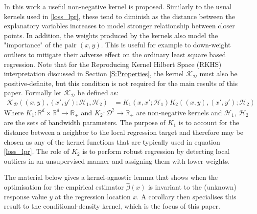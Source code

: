 \documentclass[preprint,1p,times,authoryear]{elsarticle}
\begin{document}
In this work a useful non-negative kernel is proposed. Similarly to the usual kernels used in \eqref{loss_lpr}, these tend to diminish as the distance between the explanatory variables increases to model stronger relationship between closer points. In addition, the weights produced by the kernels also model the "importance" of the pair $(x,y)$. This is useful for example to down-weight outliers to mitigate their adverse effect on the ordinary least square based regression. Note that for the Reproducing Kernel Hilbert Space (RKHS) interpretation discussed in Section \ref{S:Properties}, the kernel $\mathcal{K}_{\mathcal{D}}$ must also be positive-definite, but this condition is not required for the main results of this paper. Formally let $\mathcal{K}_{\mathcal{D}}$ be defined as:
\begin{align}
\mathcal{K}_{\mathcal{D}} \left((x,y),(x', y') ; \mathcal{H}_1, \mathcal{H}_2 \right) &= K_1(x,x' ; \mathcal{H}_1) K_2 \left((x,y),(x', y') ; \mathcal{H}_2 \right)
\label{compound_kernel_def}
\end{align}
Where $K_1: \mathbb{R}^d \times \mathbb{R}^d \rightarrow \mathbb{R}_+$ and $K_2: \mathcal{D}^2 \rightarrow \mathbb{R}_+$ are non-negative kernels and $\mathcal{H}_1$, $\mathcal{H}_2$ are the sets of bandwidth parameters. The purpose of $K_1$ is to account for the distance between a neighbor to the local regression target and therefore may be chosen as any of the kernel functions that are typically used in equation \eqref{loss_lpr}. The role of $K_2$ is to perform robust regression by detecting local outliers in an unsupervised manner and assigning them with lower weights.

The material below gives a kernel-agnostic lemma that shows when the optimisation for the empirical estimator $\hat\beta(x)$ is invariant to the (unknown) response value $y$ at the regression location $x$. A corollary then specialises this result to the conditional-density kernel, which is the focus of this paper.
\end{document}
